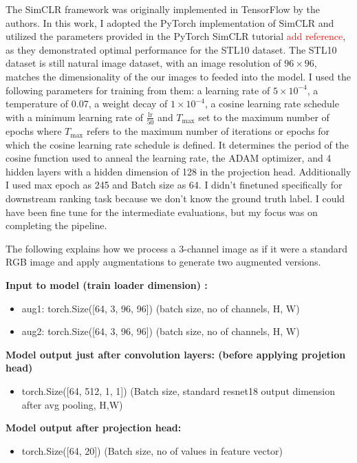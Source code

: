 The SimCLR framework was originally implemented in TensorFlow by the authors. In this work, I adopted the PyTorch implementation of SimCLR and utilized the parameters provided 
in
 the PyTorch SimCLR tutorial \textcolor{red}{add reference}, as they demonstrated optimal performance for the STL10 dataset. The STL10 dataset is still natural image dataset,
  with an image resolution of \( 96 \times 96 \),  matches the dimensionality of the our images to feeded into the model. 
 I used the following parameters for training from them: a learning rate of \( 5 \times 10^{-4} \), a temperature of 0.07, a weight decay of \( 1 \times 10^{-4} \), a cosine learning 
 rate schedule with a minimum learning rate of \( \frac{\text{lr}}{50} \) and \( T_{\text{max}} \) set to the maximum number of epochs where 
 \( T_{\text{max}} \) refers to the maximum number of iterations or epochs for which the cosine learning rate schedule is defined. It determines the period of the cosine function used to anneal the learning rate, the ADAM optimizer, and 4 hidden layers
with a hidden dimension of 128 in the projection head. Additionally I used max epoch as 245 and Batch size as 64. I didn't finetuned specifically for
 downstream ranking task because we don't know the ground truth label. I could have been fine tune for the intermediate evaluations, but my focus was on completing the pipeline. 

The following explains how we process a 3-channel image as if it were a standard RGB image and apply augmentations to generate two augmented versions.

\textbf{Input to model (train loader dimension) :} 

\begin{itemize}
  \item aug1: torch.Size([64, 3, 96, 96])        (batch size, no of channels, H, W)
  \item aug2: torch.Size([64, 3, 96, 96])        (batch size, no of channels, H, W) \vspace{1em}
\end{itemize} \vspace{1em}
\textbf{Model output just after convolution layers: (before applying projetion head)} 
\begin{itemize}
  \item torch.Size([64, 512, 1, 1]) (Batch size, standard resnet18 output dimension after avg pooling, H,W)   
\end{itemize}

\textbf{Model output after projection head:}
\begin{itemize}
  \item torch.Size([64, 20])  (Batch size, no of values in feature vector)  
\end{itemize}

